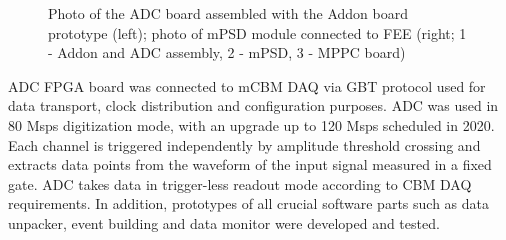 \documentclass[a4paper,11pt]{article}
\begin{document}
\begin{figure}[htbp]
\centering %
\qquad
{}
\caption{\label{fig:4} Photo of the ADC board assembled with the Addon board prototype (left); photo of mPSD module connected to FEE (right; 1 - Addon and ADC assembly, 2 - mPSD, 3 - MPPC board)}
\end{figure}

ADC FPGA board was connected to mCBM DAQ via GBT protocol used for data transport, clock distribution and configuration purposes. ADC was used in 80 Msps digitization mode, with an upgrade up to 120 Msps scheduled in 2020. Each channel is triggered independently by amplitude threshold crossing and extracts data points from the waveform of the input signal measured in a fixed gate. ADC takes data in trigger-less readout mode according to CBM DAQ requirements. In addition, prototypes of all crucial software parts such as data unpacker, event building and data monitor were developed and tested.
\end{document}
